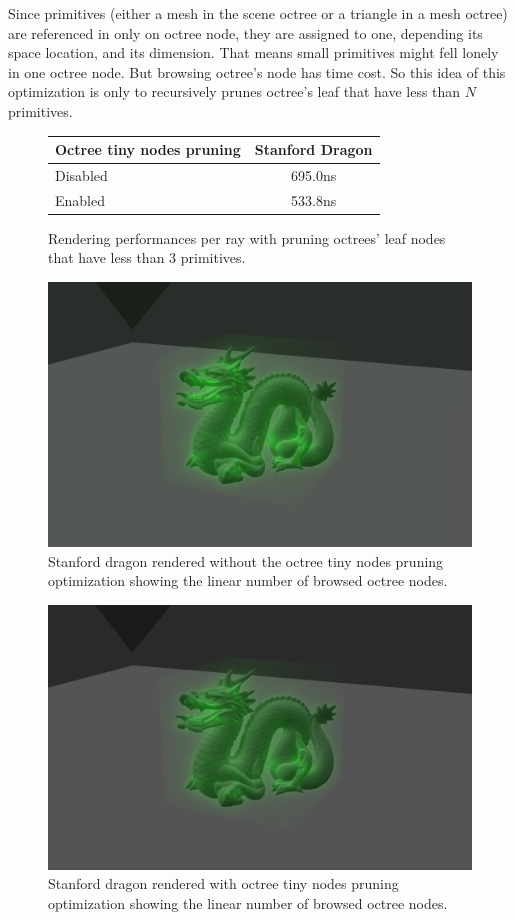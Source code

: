 Since primitives (either a mesh in the scene octree or a triangle in a mesh
octree) are referenced in only on octree node, they are assigned to one,
depending its space location, and its dimension. That means small primitives
might fell lonely in one octree node. But browsing octree's node has time cost.
So this idea of this optimization is only to recursively prunes octree's leaf
that have less than $N$ primitives.

\begin{figure}[H]
    \tiny
    \centering
    \begin{tabular}{ | l | c | }
        \hline
        Octree tiny nodes pruning & Stanford Dragon \\
        \hline
        Disabled & 695.0ns \\
        Enabled & 533.8ns \\
        \hline
    \end{tabular}
    \caption{
        Rendering performances per ray with pruning octrees' leaf nodes that
        have less than 3 primitives.
    }
    \label{table:octree_tiny_node_pruning}
\end{figure}

\begin{figure}[h]
    \centering
    \includegraphics[width=0.8\columnwidth]{stats_octree_nodes.png}
    \caption{
        Stanford dragon rendered without the octree tiny nodes pruning optimization
        showing the linear number of browsed octree nodes.
    }
    \label{fig:stanford_dragon_without_node_pruning}
\end{figure}

\begin{figure}[h]
    \centering
    \includegraphics[width=0.8\columnwidth]{stats_octree_nodes_optimized.png}
    \caption{
        Stanford dragon rendered with octree tiny nodes pruning optimization
        showing the linear number of browsed octree nodes.
    }
    \label{fig:stanford_dragon_with_node_pruning}
\end{figure}

